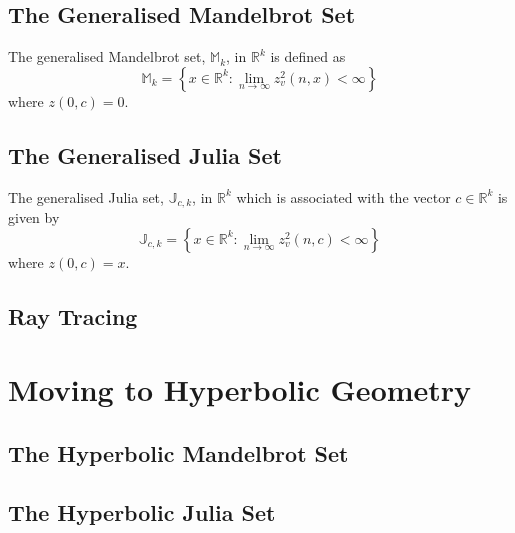 \subsection{The Generalised Mandelbrot Set}

\begin{definition}
The generalised Mandelbrot set, $\mathbb{M}_k$, in $\mathbb{R}^k$ 
    is defined as
\[
\mathbb{M}_k = 
\left\{x \in \mathbb{R}^k 
: \lim_{n \rightarrow \infty} z_v^2(n,x) < \infty \right\} 
\]
where $z(0,c) = 0$.
\end{definition}

\subsection{The Generalised Julia Set}

\begin{definition}
The generalised Julia set, $\mathbb{J}_{c,k}$, in $\mathbb{R}^k$
which is associated with the vector $c \in \mathbb{R}^k$ is given by
\[
\mathbb{J}_{c,k} = 
\left\{x \in \mathbb{R}^k
: \lim_{n \rightarrow \infty} z_v^2(n,c) < \infty \right\} 
\]
where $z(0,c) = x$.
\end{definition}

\subsection{Ray Tracing}

\section{Moving to Hyperbolic Geometry}

\subsection{The Hyperbolic Mandelbrot Set}

\subsection{The Hyperbolic Julia Set}
